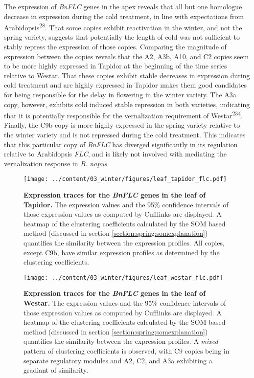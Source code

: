 \documentclass[12pt,]{book}
\begin{document}
The expression of \emph{BnFLC} genes in the apex reveals that all but
one homologue decrease in expression during the cold treatment, in line
with expectations from Arabidopsis\textsuperscript{28}. That some copies
exhibit reactivation in the winter, and not the spring variety, suggests
that potentially the length of cold was not sufficient to stably repress
the expression of those copies. Comparing the magnitude of expression
between the copies reveals that the A2, A3b, A10, and C2 copies seem to
be more highly expressed in Tapidor at the beginning of the time series
relative to Westar. That these copies exhibit stable decreases in
expression during cold treatment and are highly expressed in Tapidor
makes them good candidates for being responsible for the delay in
flowering in the winter variety. The A3a copy, however, exhibits cold
induced stable repression in both varieties, indicating that it is
potentially responsible for the vernalization requirement of
Westar\textsuperscript{234}. Finally, the C9b copy is more highly
expressed in the spring variety relative to the winter variety and is
not repressed during the cold treatment. This indicates that this
particular copy of \emph{BnFLC} has diverged significantly in its
regulation relative to Arabidopsis \emph{FLC}, and is likely not
involved with mediating the vernalization response in \emph{B. napus}.

\begin{figure}[htbp]
\centering
\texttt{[image: ../content/03\_winter/figures/leaf\_tapidor\_flc.pdf]}
\caption{\textbf{Expression traces for the \emph{BnFLC} genes in the
leaf of Tapidor.} The expression values and the 95\% confidence
intervals of those expression values as computed by Cufflinks are
displayed. A heatmap of the clustering coefficients calculated by the
SOM based method (discussed in section
\ref{section:spring:somexplanation}) quantifies the similarity between
the expression profiles. All copies, except C9b, have similar expression
profiles as determined by the clustering
coefficients.}\label{figure:3xx:flctapleaf}
\end{figure}

\begin{figure}[htbp]
\centering
\texttt{[image: ../content/03\_winter/figures/leaf\_westar\_flc.pdf]}
\caption{\textbf{Expression traces for the \emph{BnFLC} genes in the
leaf of Westar.} The expression values and the 95\% confidence intervals
of those expression values as computed by Cufflinks are displayed. A
heatmap of the clustering coefficients calculated by the SOM based
method (discussed in section \ref{section:spring:somexplanation})
quantifies the similarity between the expression profiles. A
\emph{mixed} pattern of clustering coefficients is observed, with C9
copies being in separate regulatory modules and A2, C2, and A3a
exhibiting a gradiant of similarity.}\label{figure:3xx:flcwesleaf}
\end{figure}
\end{document}
